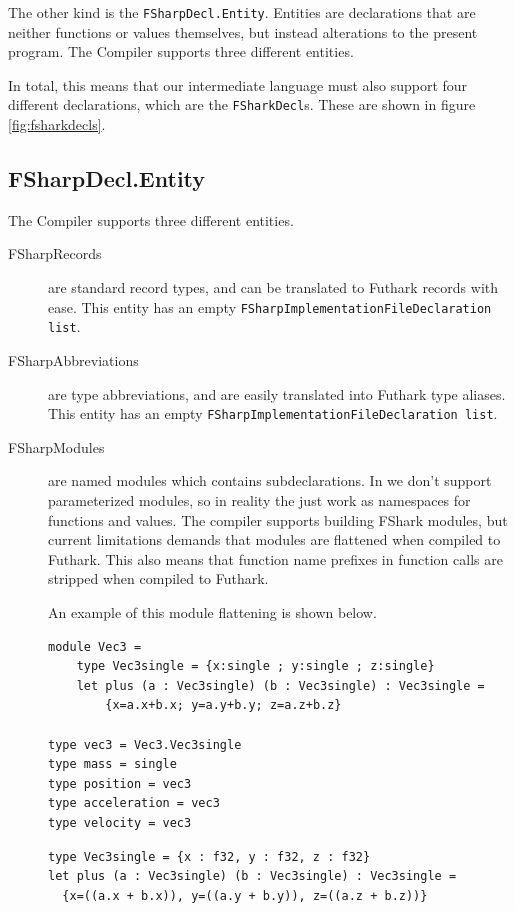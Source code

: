 The other kind is the \texttt{FSharpDecl.Entity}. Entities are \fsharp{}
declarations that are neither functions or values
themselves, but instead alterations to the present \fsharp{} program. 
The \fshark{}Compiler supports three different entities.

In total, this means that our intermediate language must also support four
different declarations, which are the \texttt{FSharkDecl}s. These are shown in
figure \ref{fig:fsharkdecls}.

\subsection{FSharpDecl.Entity}
The \fshark{}Compiler supports three different entities.
\begin{description}
\item[FSharpRecords] are standard record types, and can be translated to
  Futhark records with ease.
  This entity has an empty \texttt{FSharpImplementationFileDeclaration list}.
\item[FSharpAbbreviations] are type abbreviations, and are easily translated
  into Futhark type aliases.
  This entity has an empty \texttt{FSharpImplementationFileDeclaration list}.
\item[FSharpModules] are named modules which contains subdeclarations. In
  \fshark{} we don't support parameterized modules, so in reality the just work
  as namespaces for functions and values.
  The \fshark{} compiler supports building FShark modules, but current
  limitations demands that modules are flattened when compiled to Futhark.
  This also means that function name prefixes in function calls are stripped
  when compiled to Futhark.

  An example of this module flattening is shown below.

\begin{verbatim}
module Vec3 =
    type Vec3single = {x:single ; y:single ; z:single}
    let plus (a : Vec3single) (b : Vec3single) : Vec3single =
        {x=a.x+b.x; y=a.y+b.y; z=a.z+b.z}
            
type vec3 = Vec3.Vec3single
type mass = single
type position = vec3
type acceleration = vec3
type velocity = vec3
\end{verbatim}

\begin{lstlisting}[language=Futhark]
type Vec3single = {x : f32, y : f32, z : f32}
let plus (a : Vec3single) (b : Vec3single) : Vec3single =
  {x=((a.x + b.x)), y=((a.y + b.y)), z=((a.z + b.z))}


\end{lstlisting}
\end{description}

